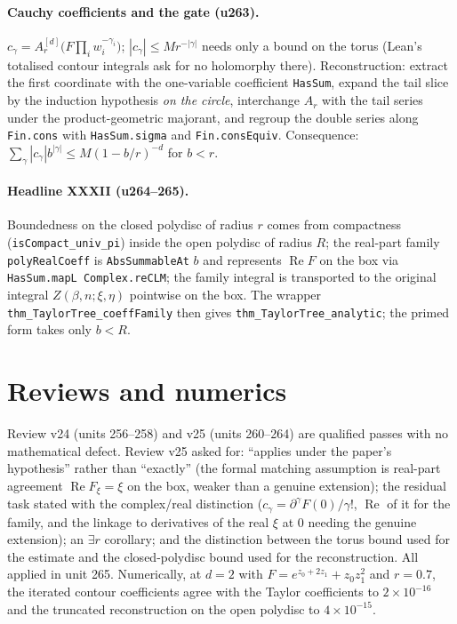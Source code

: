 \documentclass[11pt]{article}
\begin{document}
\paragraph{Cauchy coefficients and the gate (u263).} $c_\gamma=A_r^{[d]}\bigl(F\prod_iw_i^{-\gamma_i}\bigr)$;
$|c_\gamma|\le Mr^{-|\gamma|}$ needs only a bound on the torus (Lean's totalised contour integrals ask for
no holomorphy there). Reconstruction: extract the first coordinate with the one-variable coefficient
\texttt{HasSum}, expand the tail slice by the induction hypothesis \emph{on the circle}, interchange
$A_r$ with the tail series under the product-geometric majorant, and regroup the double series along
\texttt{Fin.cons} with \texttt{HasSum.sigma} and \texttt{Fin.consEquiv}. Consequence:
$\sum_\gamma|c_\gamma|b^{|\gamma|}\le M(1-b/r)^{-d}$ for $b<r$.
\paragraph{Headline XXXII (u264--265).} Boundedness on the closed polydisc of radius $r$ comes from
compactness (\texttt{isCompact\_univ\_pi}) inside the open polydisc of radius $R$; the real-part family
\texttt{polyRealCoeff} is \texttt{AbsSummableAt} $b$ and represents $\operatorname{Re}F$ on the box via
\texttt{HasSum.mapL Complex.reCLM}; the family integral is transported to the original integral
$Z(\beta,n;\xi,\eta)$ pointwise on the box. The wrapper \texttt{thm\_TaylorTree\_coeffFamily} then
gives \texttt{thm\_TaylorTree\_analytic}; the primed form takes only $b<R$.

\section{Reviews and numerics}
Review v24 (units 256--258) and v25 (units 260--264) are qualified passes with no mathematical defect.
Review v25 asked for: ``applies under the paper's hypothesis'' rather than ``exactly'' (the formal
matching assumption is real-part agreement $\operatorname{Re}F_\xi=\xi$ on the box, weaker than a
genuine extension); the residual task stated with the complex/real distinction
($c_\gamma=\partial^\gamma F(0)/\gamma!$, $\operatorname{Re}$ of it for the family, and the linkage to
derivatives of the real $\xi$ at $0$ needing the genuine extension); an $\exists r$ corollary; and the
distinction between the torus bound used for the estimate and the closed-polydisc bound used for the
reconstruction. All applied in unit 265. Numerically, at $d=2$ with $F=e^{z_0+2z_1}+z_0z_1^2$ and
$r=0.7$, the iterated contour coefficients agree with the Taylor coefficients to $2\times10^{-16}$ and the
truncated reconstruction on the open polydisc to $4\times10^{-15}$.
\end{document}
